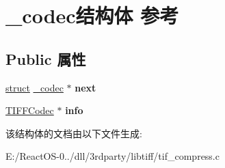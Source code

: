 \hypertarget{struct__codec}{}\section{\+\_\+codec结构体 参考}
\label{struct__codec}
\subsection*{Public 属性}
\begin{DoxyCompactItemize}
\item 
\mbox{\label{struct__codec_a43b6e1e3c5ab5096210a6c20e0fd263b}} 
\hyperlink{interfacestruct}{struct} \hyperlink{struct__codec}{\+\_\+codec} $\ast$ {\bfseries next}
\item 
\mbox{\label{struct__codec_a27e8760da709807acde92b0b7f43ecfd}} 
\hyperlink{struct_t_i_f_f_codec}{T\+I\+F\+F\+Codec} $\ast$ {\bfseries info}
\end{DoxyCompactItemize}


该结构体的文档由以下文件生成\+:\begin{DoxyCompactItemize}
\item 
E\+:/\+React\+O\+S-\/0../dll/3rdparty/libtiff/tif\+\_\+compress.\+c\end{DoxyCompactItemize}
